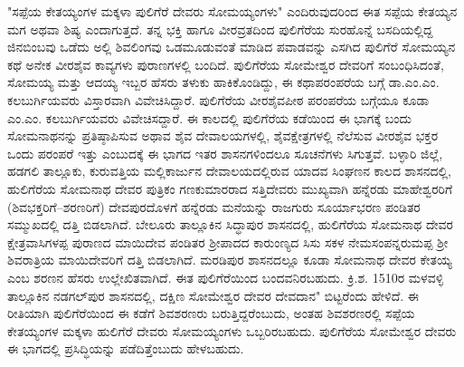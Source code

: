 "ಸಪ್ಪೆಯ ಕೇತಯ್ಯಂಗಳ ಮಕ್ಕಳಾ ಪುಲಿಗೆರೆ ದೇವರು ಸೋಮಯ್ಯಂಗಳು" ಎಂದಿರುವುದರಿಂದ ಈತ ಸಪ್ಪೆಯ ಕೇತಯ್ಯನ ಮಗ ಅಥವಾ ಶಿಷ್ಯ ಎಂದಾಗುತ್ತದೆ. ತನ್ನ ಭಕ್ತಿ ಹಾಗೂ ವೀರವ್ರತದಿಂದ ಪುಲಿಗೆರೆಯ ಸುರಹೊನ್ನೆ ಬಸದಿಯಲ್ಲಿದ್ದ ಜಿನಬಿಂಬವು ಒಡೆದು ಅಲ್ಲಿ ಶಿವಲಿಂಗವು ಒಡಮೂಡುವಂತೆ ಮಾಡಿದ ಪವಾಡವನ್ನು ಎಸಗಿದ ಪುಲಿಗೆರೆ ಸೋಮಯ್ಯನ ಕಥೆ ಅನೇಕ ವೀರಶೈವ ಕಾವ್ಯಗಳು ಪುರಾಣಗಳಲ್ಲಿ ಬಂದಿದೆ. ಪುಲಿಗೆರೆಯ ಸೋಮೇಶ್ವರ ದೇವರಿಗೆ ಸಂಬಂಧಿಸಿದಂತೆ, ಸೋಮಯ್ಯ ಮತ್ತು ಆದಯ್ಯ ಇಬ್ಬರ ಹೆಸರು ತಳುಕು ಹಾಕಿಕೊಂಡಿದ್ದು, ಈ ಕಥಾಪರಂಪರೆಯ ಬಗ್ಗೆ ಡಾ.ಎಂ.ಎಂ. ಕಲಬುರ್ಗಿಯವರು ವಿಸ್ತಾರವಾಗಿ ವಿವೇಚಿಸಿದ್ದಾರೆ. ಪುಲಿಗೆರೆಯ ವೀರಶೈವಪೀಠ ಪರಂಪರೆಯ ಬಗ್ಗೆಯೂ ಕೂಡಾ ಎಂ.ಎಂ. ಕಲಬುರ್ಗಿಯವರು ವಿವೇಚಿಸದ್ದಾರೆ. ಈ ಕಾಲದಲ್ಲಿ ಪುಲಿಗೆರೆಯ ಕಡೆಯಿಂದ ಈ ಭಾಗಕ್ಕೆ ಬಂದು ಸೋಮನಾಥನನ್ನು ಪ್ರತಿಷ್ಠಾಪಿಸುವ ಅಥಾವ ಶೈವ ದೇವಾಲಯಗಳಲ್ಲಿ, ಶೈವಕ್ಷೇತ್ರಗಳಲ್ಲಿ ನೆಲೆಸುವ ವೀರಶೈವ ಭಕ್ತರ ಒಂದು ಪರಂಪರೆ ಇತ್ತು ಎಂಬುದಕ್ಕೆ ಈ ಭಾಗದ ಇತರ ಶಾಸನಗಳಿಂದಲೂ ಸೂಚನೆಗಳು ಸಿಗುತ್ತವೆ. ಬಳ್ಳಾರಿ ಜಿಲ್ಲೆ, ಹಡಗಲಿ ತಾಲ್ಲೂಕು, ಕುರುವತ್ತಿಯ ಮಲ್ಲಿಕಾರ್ಜುನ ದೇವಾಲಯದಲ್ಲಿರುವ ಯಾದವ ಸಿಂಘಣನ ಕಾಲದ ಶಾಸನದಲ್ಲಿ, ಹುಲಿಗೆರೆಯ ಸೋಮನಾಥ ದೇವರ ಪುತ್ರಿಕಂ ಗಣಕುಮಾರರಾದ ಸತ್ತಿದೇವರು ಮುಖ್ಯವಾಗಿ ಹನ್ನೆರಡು ಮಾಹೇಶ್ವರರಿಗೆ (ಶಿವಭಕ್ತರಿಗೆ–ಶರಣರಿಗೆ) ದೇವಪುರದೊಳಗೆ ಹನ್ನೆರಡು ಮನೆಯನ್ನು ರಾಜಗುರು ಸೂರ್ಯಾಭರಣ ಪಂಡಿತರ ಸಮ್ಮುಖದಲ್ಲಿ ದತ್ತಿ ಬಿಡಲಾಗಿದೆ. ಬೇಲೂರು ತಾಲ್ಲೂಕಿನ ಸಿದ್ಧಾಪುರ ಶಾಸನದಲ್ಲಿ, ಹುಲಿಗೆರೆಯ ಸೋಮನಾಥ ದೇವರ ಕ್ಷೇತ್ರವಾಸಿಗಳಪ್ಪ ಪುರಾಣದ ಮಾಯಿದೇವ ಪಂಡಿತರ ಶ‍್ರೀಪಾದದ ಕಾರುಂಣ್ಯದ ಸಿಸು ಸಕಳ ನೇಮಸಂಪನ್ನರುಮಪ್ಪ ಶ‍್ರೀ ಶಿವರಾತ್ರಿಯ ಮಾಯಿದೇವರಿಗೆ ದತ್ತಿ ಬಿಡಲಾಗಿದೆ. ಮರಡಿಪುರ ಶಾಸನದಲ್ಲೂ ಕೂಡಾ ಸೋಮನಾಥ ದೇವರ ಕೇತಯ್ಯ ಎಂಬ ಶರಣನ ಹೆಸರು ಉಲ್ಲೇಖಿತವಾಗಿದೆ. ಈತ ಪುಲಿಗೆರೆಯಿಂದ ಬಂದವನಿರಬಹುದು. ಕ್ರಿ.ಶ. 1510ರ ಮಳವಳ್ಳಿ ತಾಲ್ಲೂಕಿನ ನಡಗಲ್​ಪುರ ಶಾಸನದಲ್ಲಿ, ದಕ್ಷಿಣ ಸೋಮೇಶ್ವರ ದೇವರ ದೇವದಾನ" ಬಿಟ್ಟರೆಂದು ಹೇಳಿದೆ. ಈ ರೀತಿಯಾಗಿ ಪುಲಿಗೆರೆಯಿಂದ ಈ ಕಡೆಗೆ ಶಿವಶರಣರು ಬರುತ್ತಿದ್ದರೆಂಬುದು, ಅಂತಹ ಶಿವಶರಣರಲ್ಲಿ ಸಪ್ಪೆಯ ಕೇತಯ್ಯಂಗಳ ಮಕ್ಕಳಾ ಹುಲಿಗೆರೆ ದೇವರು ಸೋಮಯ್ಯಂಗಳು ಒಬ್ಬರಿರಬಹುದು. ಪುಲಿಗೆರೆಯ ಸೋಮೇಶ್ವರ ದೇವರು ಈ ಭಾಗದಲ್ಲಿ ಪ್ರಸಿದ್ಧಿಯನ್ನು ಪಡೆದಿತ್ತೆಂಬುದು ಹೇಳಬಹುದು.

